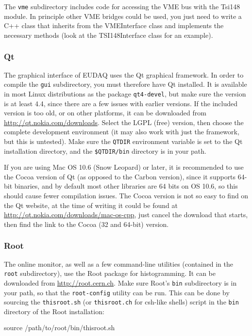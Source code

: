 The \texttt{vme} subdirectory includes code for accessing the VME bus with the Tsi148 module.
In principle other VME bridges could be used,
you just need to write a C++ class that inherits from the VMEInterface class
and implements the necessary methods (look at the TSI148Interface class for an example).

\subsubsection{Qt}
The graphical interface of EUDAQ uses the Qt graphical framework.
In order to compile the \texttt{gui} subdirectory, you must therefore have Qt installed.
It is available in most Linux distributions as the package \texttt{qt4-devel},
but make sure the version is at least 4.4, since there are a few issues with earlier versions.
If the included version is too old, or on other platforms,
it can be downloaded from \url{http://qt.nokia.com/downloads}.
Select the LGPL (free) version, then choose the complete development environment
(it may also work with just the framework, but this is untested).
Make sure the \texttt{QTDIR} environment variable is set to the Qt installation directory,
and the \texttt{\$QTDIR/bin} directory is in your path.

If you are using Mac OS 10.6 (Snow Leopard) or later, it is recommended to use the Cocoa version of Qt
(as opposed to the Carbon version), since it supports 64-bit binaries,
and by default most other libraries are 64 bits on OS 10.6, so this should cause fewer compilation issues.
The Cocoa version is not so easy to find on the Qt website, at the time of writing it could be found at
\url{http://qt.nokia.com/downloads/mac-os-cpp},
just cancel the download that starts, then find the link to the Cocoa (32 and 64-bit) version.

\subsubsection{Root}\label{sec:Root}
The online monitor, as well as a few command-line utilities (contained in the \texttt{root} subdirectory),
use the Root package for histogramming.
It can be downloaded from \url{http://root.cern.ch}.
Make sure Root's \texttt{bin} subdirectory is in your path, so that the \texttt{root-config} utility can be run.
This can be done by sourcing the \texttt{thisroot.sh} (or \texttt{thisroot.ch} for csh-like shells)
script in the \texttt{bin} directory of the Root installation:
\begin{listing}[mybash]
source /path/to/root/bin/thisroot.sh
\end{listing}

